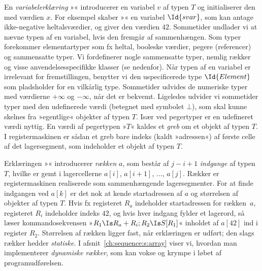 En \emph{variabelerklæring}
»« 
introducerer en variabel $v$ af typen $T$
og initialiserer
den med værdien $x$.
For eksempel skaber »«
en variabel $\Id{svar}$, som kan antage ikke-negative heltalsværdier, og giver den værdien $42$.
Sommetider undlader vi at nævne typen af en variabel, hvis den fremgår af sammenhængen.
Som typer forekommer elementartyper som fx heltal,
booleske værdier,
pegere (referencer)
og sammensatte typer.
Vi fordefinerer nogle sammensatte typer, nemlig rækker og visse anvendelsesspecifikke klasser
(se nedenfor).
Når typen af en variabel er irrelevant for fremstillingen, benytter vi den uspecificerede type $\Id{Element}$
som pladsholder for en vilkårlig type.
Sommetider udvides de numeriske typer
med værdierne $+\infty$ og $-\infty$,
når det er bekvemt.
Ligeledes udvider vi sommetider typer med den udefinerede værdi (betegnet med symbolet $\bot$),
som skal kunne skelnes fra »egentlige« objekter af typen $T$.
Især ved pegertyper er en udefineret værdi nyttig.
En værdi af pegertypen »\PointerTo $T$« kaldes et \emph{greb}
om et objekt af typen $T$.
I registermaskinen er sådan et greb bare indeks (kaldt »adressen«)
af første celle af det lagersegment, som indeholder et objekt af typen $T$.

Erklæringen »« introducerer \emph{rækken}
$a$, som består af $j-i+1$ \emph{indgange} af typen $T$, hvilke er gemt i lagercellerne $a[i]$, $a[i+1]$, $\ldots$, $a[j]$.
Rækker er registermaskinen realiserede som sammenhængende lagersegmenter.
For at finde indgangen ved $a[k]$ er det nok at kende startadressen af $a$ og størrelsen af objekter af typen $T$.
Hvis fx registeret $R_a$ indeholder startadressen for rækken~$a$, registeret $R_i$ indeholder indeks $42$, og hvis hver indgang fylder et lager\-ord, så læser kommandosekvensen »$R_1\Is R_a+R_i; R_2\Is S[R_1]$« inholdet af $a[42]$ ind i register $R_2$.
Størrelsen af rækken ligger fast, når erklæringen er udført; den slags rækker hedder \emph{statiske}.
I afsnit~\ref{ch:sequence:s:array} viser vi, hvordan man implementerer \emph{dynamiske rækker}, som kan vokse og krympe i løbet af programudførelsen.

